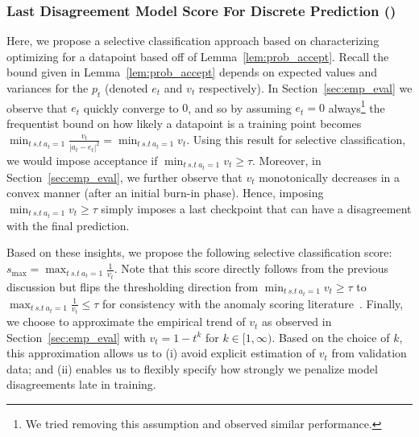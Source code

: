 
\subsubsection{Last Disagreement Model Score For Discrete Prediction (\smax)}
\label{ssec:min_score}

Here, we propose a selective classification approach based on characterizing optimizing for a datapoint based off of Lemma~\ref{lem:prob_accept}. 
Recall the bound given in Lemma~\ref{lem:prob_accept} depends on expected values and variances for the $p_t$ (denoted $e_t$ and $v_t$ respectively). In Section~\ref{sec:emp_eval} we observe that $e_t$ quickly converge to $0$, and so by assuming $e_t = 0$ always\footnote{We tried removing this assumption and observed similar performance.} %
the frequentist bound on how likely a datapoint is a training point %
becomes $\min_{t~s.t~a_t = 1} \frac{v_t}{|a_t - e_t|^2}= \min_{t~s.t~a_t = 1}v_t$. Using this result for selective classification, we would impose acceptance if $\min_{t~s.t~a_t = 1}v_t \geq \tau$. Moreover, in Section~\ref{sec:emp_eval}, we further observe that $v_t$ monotonically decreases in a convex manner (after an initial burn-in phase). Hence, imposing $\min_{t~s.t~a_t = 1}v_t \geq \tau$ simply imposes a last checkpoint that can have a disagreement with the final prediction.

Based on these insights, we propose the following selective classification score: %
$s_{\max} = \max_{t~s.t~a_t = 1} \frac{1}{v_t}$. Note that this score directly follows from the previous discussion but flips the thresholding direction from $\min_{t~s.t~a_t = 1}v_t \geq \tau$ to $\max_{t~s.t~a_t = 1} \frac{1}{v_t} \leq \tau$ for consistency with the anomaly scoring literature~\citep{ruff2018deep}. Finally, we choose to approximate the empirical trend of $v_t$ as observed in Section~\ref{sec:emp_eval} with $v_t = 1 - t^k$ for $k \in [1,\infty)$. Based on the choice of $k$, this approximation allows us to (i) avoid explicit estimation of $v_t$ from validation data; and (ii) enables us to flexibly specify how strongly we penalize model disagreements late in training.

